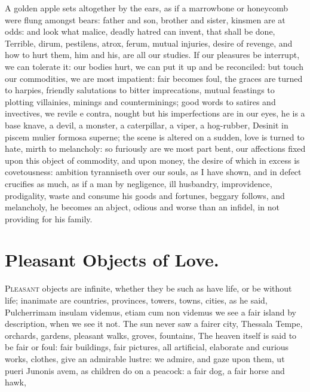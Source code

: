 {A golden apple sets altogether by the ears, as if a marrowbone or
honeycomb were flung amongst bears: father and son, brother and sister,
kinsmen are at odds: and look what malice, deadly hatred can invent,
that shall be done, Terrible, dirum, pestilens, atrox, ferum, mutual
injuries, desire of revenge, and how to hurt them, him and his, are all
our studies. If our pleasures be interrupt, we can tolerate it: our
bodies hurt, we can put it up and be reconciled: but touch our
commodities, we are most impatient: fair becomes foul, the graces are
turned to harpies, friendly salutations to bitter imprecations, mutual
feastings to plotting villainies, minings and counterminings; good
words to satires and invectives, we revile e contra, nought but his
imperfections are in our eyes, he is a base knave, a devil, a monster,
a caterpillar, a viper, a hog-rubber, \etc{} Desinit in piscem mulier
formosa superne; the scene is altered on a sudden, love is turned
to hate, mirth to melancholy: so furiously are we most part bent, our
affections fixed upon this object of commodity, and upon money, the
desire of which in excess is covetousness: ambition tyranniseth over
our souls, as I have shown, and in defect crucifies as much, as
if a man by negligence, ill husbandry, improvidence, prodigality, waste
and consume his goods and fortunes, beggary follows, and melancholy, he
becomes an abject, odious and worse than an infidel, in not
providing for his family.

\section{Pleasant Objects of Love.}

\lettrine{P}{leasant} objects are infinite, whether they be such as have life, or be
without life; inanimate are countries, provinces, towers, towns,
cities, as he said, Pulcherrimam insulam videmus, etiam cum non
videmus we see a fair island by description, when we see it not. The
sun never saw a fairer city, Thessala Tempe, orchards, gardens,
pleasant walks, groves, fountains, \etc{} The heaven itself is said to be
fair or foul: fair buildings, fair pictures, all
artificial, elaborate and curious works, clothes, give an admirable
lustre: we admire, and gaze upon them, ut pueri Junonis avem, as
children do on a peacock: a fair dog, a fair horse and hawk, \etc{}

}
